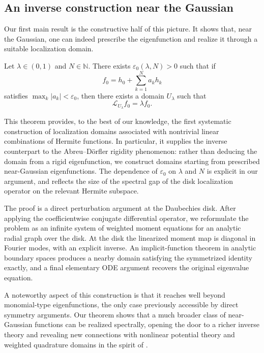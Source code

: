 \subsection{An inverse construction near the Gaussian}

Our first main result is the constructive half of this picture. It shows that, near the Gaussian, one can indeed prescribe the eigenfunction and realize it through a suitable localization domain.

\begin{theorem}\label{thm:perturb}
Let $\lambda\in (0,1)$ and $N\in\mathbb N$. There exists $\varepsilon_0(\lambda,N)>0$ such that if
\[
f_0 = h_0 + \sum_{k=1}^N a_k h_k
\]
satisfies $\max_k |a_k|<\varepsilon_0$, then there exists a domain $U_\lambda$ such that
\[
\mathcal L_{U_\lambda} f_0 = \lambda f_0 .
\]
\end{theorem}

This theorem provides, to the best of our knowledge, the first systematic construction of localization domains associated with nontrivial linear combinations of Hermite functions. In particular, it supplies the inverse counterpart to the Abreu--D\"orfler rigidity phenomenon: rather than deducing the domain from a rigid eigenfunction, we construct domains starting from prescribed near-Gaussian eigenfunctions. The dependence of $\varepsilon_0$ on $\lambda$ and $N$ is explicit in our argument, and reflects the size of the spectral gap of the disk localization operator on the relevant Hermite subspace.

The proof is a direct perturbation argument at the Daubechies disk. After
applying the coefficientwise conjugate differential operator, we reformulate
the problem as an infinite system of weighted moment equations for an analytic
radial graph over the disk. At the disk the linearized moment map is diagonal
in Fourier modes, with an explicit inverse. An implicit-function theorem in
analytic boundary spaces produces a nearby domain satisfying the symmetrized
identity exactly, and a final elementary ODE argument recovers the original
eigenvalue equation.

A noteworthy aspect of this construction is that it reaches well beyond monomial-type eigenfunctions, the only case previously accessible by direct symmetry arguments. Our theorem shows that a much broader class of near-Gaussian functions can be realized spectrally, opening the door to a richer inverse theory and revealing new connections with nonlinear potential theory and weighted quadrature domains in the spirit of \cite{Gustafsson-Shahgholian,Shahgholian}.

